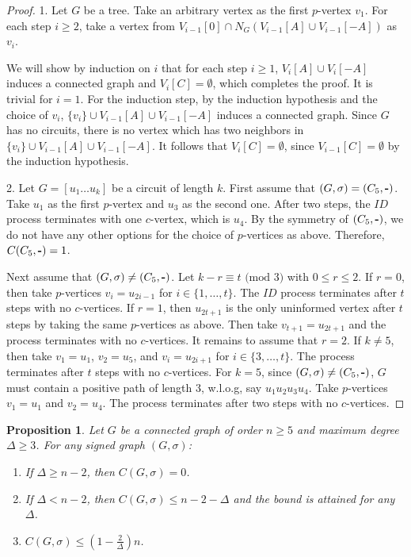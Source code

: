 \documentclass[a4paper,11pt]{article}
\newtheorem{prop}[defi]{Proposition}
\theoremstyle{remark}
\begin{document}
\begin{proof}
    1. Let $G$ be a tree. Take an arbitrary vertex as the first $p$-vertex $v_1$.
    For each step $i\geq 2$, take a vertex from $V_{i-1}[0]\cap N_G(V_{i-1}[A]\cup V_{i-1}[-A])$ as $v_i$. 
    
    We will show by induction on $i$ that for each step $i\geq 1$, $V_{i}[A]\cup V_{i}[-A]$ induces a connected graph and $V_i[C]=\emptyset$, which completes the proof. It is trivial for $i=1$. For the induction step, by the induction hypothesis and the choice of $v_i$, $\{v_i\} \cup V_{i-1}[A]\cup V_{i-1}[-A]$ induces a connected graph. Since $G$ has no circuits, there is no vertex which has two neighbors in $\{v_i\} \cup V_{i-1}[A]\cup V_{i-1}[-A]$. It follows that $V_i[C]=\emptyset$, since $V_{i-1}[C]=\emptyset$ by the induction hypothesis.
    
 
    2. Let $G=[u_1\ldots u_k]$ be a circuit of length $k$.
    First assume that $(G,\sigma)=(C_5,\texttt{\bf -})$. Take $u_1$ as the first $p$-vertex and $u_3$ as the second one. After two steps, the $ID$ process terminates with one $c$-vertex, which is $u_4$. By the symmetry of $(C_5,\texttt{\bf -})$, we do not have any other options for the choice of $p$-vertices as above. Therefore, $C(C_5,\texttt{\bf -})=1$.

    Next assume that $(G,\sigma)\neq (C_5,\texttt{\bf -})$. 
    Let $k-r\equiv t \text{ (mod $3$)}$ with $0\leq r \leq 2$. If $r=0$, then take  $p$-vertices $v_i=u_{2i-1}$ for $i\in \{1,\ldots,t\}$. 
    The $ID$ process terminates after $t$ steps with no $c$-vertices.
    If $r=1$, then $u_{2t+1}$ is the only uninformed vertex after $t$ steps by taking the same $p$-vertices as above. Then take $v_{t+1}=u_{2t+1}$ and the process terminates with no $c$-vertices. It remains to assume that $r=2$. 
    If $k\neq 5$, then take $v_1=u_1$, $v_2=u_5$, and $v_i=u_{2i+1}$ for $i\in \{3,\ldots,t\}$.
    The process terminates after $t$ steps with no $c$-vertices.
    For $k=5$, since $(G,\sigma)\neq (C_5,\texttt{\bf -})$, $G$ must contain a positive path of length 3, w.l.o.g, say $u_1u_2u_3u_4$. Take $p$-vertices $v_1=u_1$ and $v_2=u_4$. The process terminates after two steps with no $c$-vertices.
\end{proof} 

\begin{prop}\label{prop_H_n}
Let $G$ be a connected graph of order $n \geq 5$ and maximum degree $\Delta \geq 3$. 
For any signed graph $(G,\sigma)$:    
\begin{enumerate}
    \item If $\Delta \geq n - 2$, then $C(G,\sigma) = 0$.
    \item If $\Delta < n - 2$,  then $C(G,\sigma) \leq n - 2 - \Delta$ and the bound is attained for 
    any $\Delta$.
    \item $C(G,\sigma)\leq (1-\frac{2}{\Delta})n$.
\end{enumerate}
\end{prop}
\end{document}
